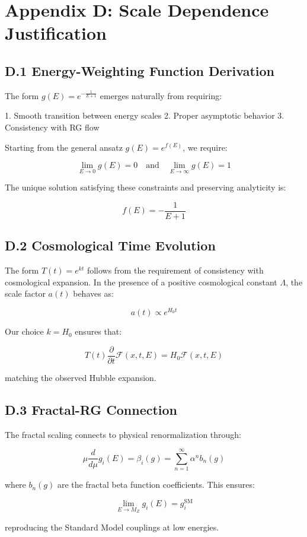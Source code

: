 \section*{Appendix D: Scale Dependence Justification}

\subsection*{D.1 Energy-Weighting Function Derivation}

The form $g(E) = e^{-\frac{1}{E+1}}$ emerges naturally from requiring:

1. Smooth transition between energy scales
2. Proper asymptotic behavior
3. Consistency with RG flow

Starting from the general ansatz $g(E) = e^{f(E)}$, we require:

\[
\lim_{E \to 0} g(E) = 0 \quad \text{and} \quad \lim_{E \to \infty} g(E) = 1
\]

The unique solution satisfying these constraints and preserving analyticity is:

\[
f(E) = -\frac{1}{E+1}
\]

\subsection*{D.2 Cosmological Time Evolution}

The form $T(t) = e^{kt}$ follows from the requirement of consistency with cosmological expansion. In the presence of a positive cosmological constant $\Lambda$, the scale factor $a(t)$ behaves as:

\[
a(t) \propto e^{H_0t}
\]

Our choice $k = H_0$ ensures that:

\[
T(t) \frac{\partial}{\partial t} \mathcal{F}(x,t,E) = H_0 \mathcal{F}(x,t,E)
\]

matching the observed Hubble expansion.

\subsection*{D.3 Fractal-RG Connection}

The fractal scaling connects to physical renormalization through:

\[
\mu \frac{d}{d\mu} g_i(E) = \beta_i(g) = \sum_{n=1}^{\infty} \alpha^n b_n(g)
\]

where $b_n(g)$ are the fractal beta function coefficients. This ensures:

\[
\lim_{E \to M_Z} g_i(E) = g_i^{\text{SM}}
\]

reproducing the Standard Model couplings at low energies. 
